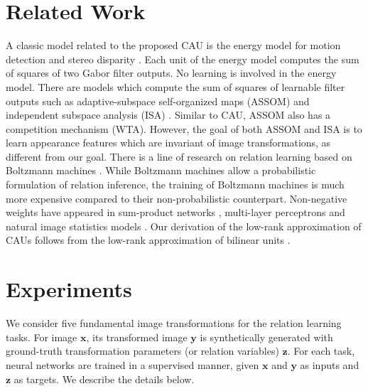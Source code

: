 \documentclass[conference]{IEEEtran}
\begin{document}
\section{Related Work} \label{sec:related_work}
A classic model related to the proposed CAU is the 
energy model for motion detection \cite{adelson1985spatiotemporal} and stereo disparity \cite{fleet1996neural}. Each unit of the energy model computes the sum of squares of two Gabor filter outputs. No learning is involved in the energy model. There are models which compute the sum of squares of learnable filter outputs such as adaptive-subspace self-organized maps (ASSOM) \cite{kohonen1996emergence} and  independent subspace analysis (ISA) \cite{hyvarinen2000emergence}. Similar to CAU, ASSOM also has a competition mechanism (WTA).  However, the goal of both ASSOM and ISA is to learn appearance features which are invariant of image transformations, as different from our goal.
There is a line of research on relation learning based on Boltzmann machines \cite{memisevic2010learning,susskind2011modeling,huang2015conditional}. 
While Boltzmann machines allow a probabilistic formulation of relation inference, the training of Boltzmann machines is much more expensive compared to their non-probabilistic counterpart.
Non-negative weights have appeared in sum-product networks \cite{poon2011sum}, multi-layer perceptrons \cite{chorowski2015learning} and natural image statistics models \cite{hoyer2002multi,gutmann2013three}.
Our derivation of the low-rank approximation of CAUs follows from the low-rank approximation of bilinear units \cite{memisevic2010learning,kim2016hadamard}.

\section{Experiments} \label{sec:experiments}
We consider five fundamental image transformations for the relation learning tasks.
For image $\mathbf{x}$, its transformed image $\mathbf{y}$ is synthetically generated with ground-truth transformation parameters (or relation variables) $\mathbf{z}$. For each task, neural networks are trained in a supervised manner, given $\mathbf{x}$ and $\mathbf{y}$ as inputs and $\mathbf{z}$ as targets. We describe the details below.
\end{document}
